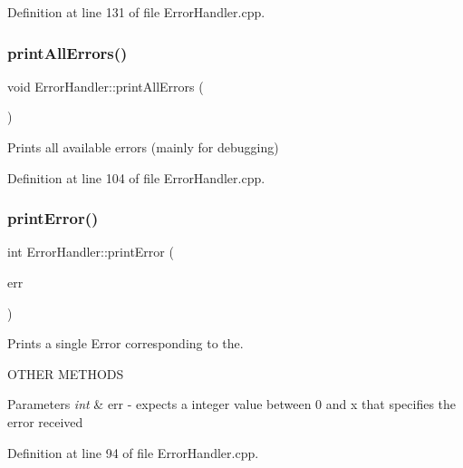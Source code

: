 Definition at line 131 of file Error\+Handler.\+cpp.

\mbox{\label{classErrorHandler_a1108324c221544c928a2de3a2cf9ba98}} 
\subsubsection{\texorpdfstring{printAllErrors()}{printAllErrors()}}
{\footnotesize\ttfamily void Error\+Handler\+::print\+All\+Errors (\begin{DoxyParamCaption}\item[{void}]{ }\end{DoxyParamCaption})}



Prints all available errors (mainly for debugging) 



Definition at line 104 of file Error\+Handler.\+cpp.

\mbox{\label{classErrorHandler_ab90b8248f24e3129df69d224585956dd}} 
\subsubsection{\texorpdfstring{printError()}{printError()}\hspace{0.1cm}{\footnotesize\ttfamily [1/2]}}
{\footnotesize\ttfamily int Error\+Handler\+::print\+Error (\begin{DoxyParamCaption}\item[{int}]{err }\end{DoxyParamCaption})}



Prints a single Error corresponding to the. 

O\+T\+H\+ER M\+E\+T\+H\+O\+DS
\begin{DoxyParams}{Parameters}
{\em int} & err -\/ expects a integer value between 0 and x that specifies the error received \\
\hline
\end{DoxyParams}


Definition at line 94 of file Error\+Handler.\+cpp.

